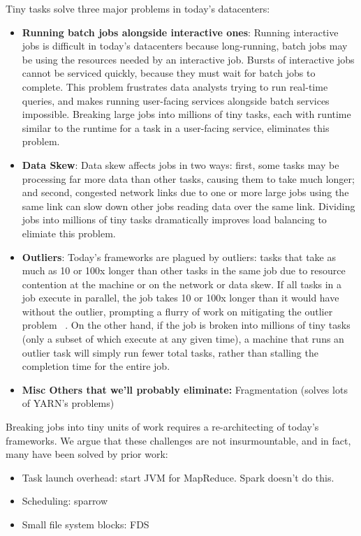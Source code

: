 Tiny tasks solve three major problems in today's datacenters:
\begin{itemize}
\item \textbf{Running batch jobs alongside interactive ones}: Running interactive
jobs is difficult in today's datacenters because long-running, batch jobs may be
using the resources needed by an interactive job. Bursts of interactive jobs
cannot be serviced quickly, because they must wait for batch jobs to complete.
This problem frustrates data analysts trying to run real-time queries, and makes
running user-facing services alongside batch services impossible. Breaking large
jobs into millions of tiny tasks, each with runtime similar to the runtime for a
task in a user-facing service, eliminates this problem.
\item \textbf{Data Skew}: Data skew affects jobs in two ways: first, some tasks
may be processing far more data than other tasks, causing them to take much
longer; and second, congested network links due to one or more large jobs using
the same link can slow down other jobs reading data over the same link. Dividing
jobs into millions of tiny tasks dramatically improves load balancing to elimiate
this problem.
\item \textbf{Outliers}: Today's frameworks are plagued by outliers: tasks that
take as much as 10 or 100x longer than other tasks in the same job due to
resource contention at the machine or on the network or data skew.  If all tasks in a job execute in parallel, the job takes 10 or 100x longer than it would
have without the outlier, prompting a flurry of work on mitigating the outlier
problem ~\cite{blah,blah,blah}. On the other hand, if the job is broken into millions of tiny tasks (only a subset of which execute at any given time), a machine
that runs an outlier task will simply run fewer total tasks, rather than
stalling the completion time for the entire job.
\item \textbf{Misc Others that we'll probably eliminate:} Fragmentation (solves
lots of YARN's problems)
\end{itemize}

Breaking jobs into tiny units of work requires a re-architecting of today's frameworks.  We argue that these challenges are not insurmountable, and in fact, many
have been solved by prior work:
\begin{itemize}
\item Task launch overhead: start JVM for MapReduce. Spark doesn't do this.
\item Scheduling: sparrow
\item Small file system blocks: FDS
\end{itemize}

